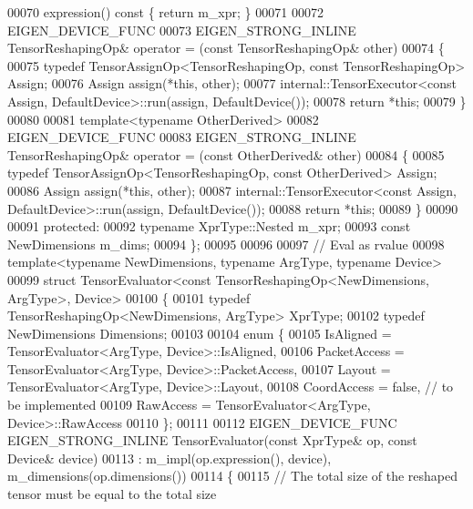 \begin{DoxyCode}
00070     expression()\textcolor{keyword}{ const }\{ \textcolor{keywordflow}{return} m\_xpr; \}
00071 
00072     EIGEN\_DEVICE\_FUNC
00073     EIGEN\_STRONG\_INLINE TensorReshapingOp& operator = (\textcolor{keyword}{const} TensorReshapingOp& other)
00074     \{
00075       \textcolor{keyword}{typedef} TensorAssignOp<TensorReshapingOp, const TensorReshapingOp> Assign;
00076       Assign assign(*\textcolor{keyword}{this}, other);
00077       internal::TensorExecutor<const Assign, DefaultDevice>::run(assign, DefaultDevice());
00078       \textcolor{keywordflow}{return} *\textcolor{keyword}{this};
00079     \}
00080 
00081     \textcolor{keyword}{template}<\textcolor{keyword}{typename} OtherDerived>
00082     EIGEN\_DEVICE\_FUNC
00083     EIGEN\_STRONG\_INLINE TensorReshapingOp& operator = (\textcolor{keyword}{const} OtherDerived& other)
00084     \{
00085       \textcolor{keyword}{typedef} TensorAssignOp<TensorReshapingOp, const OtherDerived> Assign;
00086       Assign assign(*\textcolor{keyword}{this}, other);
00087       internal::TensorExecutor<const Assign, DefaultDevice>::run(assign, DefaultDevice());
00088       \textcolor{keywordflow}{return} *\textcolor{keyword}{this};
00089     \}
00090 
00091   \textcolor{keyword}{protected}:
00092     \textcolor{keyword}{typename} XprType::Nested m\_xpr;
00093     \textcolor{keyword}{const} NewDimensions m\_dims;
00094 \};
00095 
00096 
00097 \textcolor{comment}{// Eval as rvalue}
00098 \textcolor{keyword}{template}<\textcolor{keyword}{typename} NewDimensions, \textcolor{keyword}{typename} ArgType, \textcolor{keyword}{typename} Device>
00099 \textcolor{keyword}{struct }TensorEvaluator<const TensorReshapingOp<NewDimensions, ArgType>, Device>
00100 \{
00101   \textcolor{keyword}{typedef} TensorReshapingOp<NewDimensions, ArgType> XprType;
00102   \textcolor{keyword}{typedef} NewDimensions Dimensions;
00103 
00104   \textcolor{keyword}{enum} \{
00105     IsAligned = TensorEvaluator<ArgType, Device>::IsAligned,
00106     PacketAccess = TensorEvaluator<ArgType, Device>::PacketAccess,
00107     Layout = TensorEvaluator<ArgType, Device>::Layout,
00108     CoordAccess = \textcolor{keyword}{false},  \textcolor{comment}{// to be implemented}
00109     RawAccess = TensorEvaluator<ArgType, Device>::RawAccess
00110   \};
00111 
00112   EIGEN\_DEVICE\_FUNC EIGEN\_STRONG\_INLINE TensorEvaluator(\textcolor{keyword}{const} XprType& op, \textcolor{keyword}{const} Device& device)
00113       : m\_impl(op.expression(), device), m\_dimensions(op.dimensions())
00114   \{
00115     \textcolor{comment}{// The total size of the reshaped tensor must be equal to the total size}

\end{DoxyCode}
